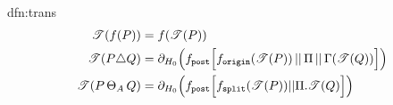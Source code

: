 \documentclass[../hons_project.tex]{subfiles}
\begin{document}
\begin{dfn}{dfn:trans}{}
\begin{align*}
		\mathscr{T}(f(P))           & = f(\mathscr{T}(P))                                                                                                                                                                               \\
		\mathscr{T}(P \triangle Q) & = \partial_{H_{0}}\Bigl(f_{\mathtt{post}}\Bigl[ f_{\mathtt{origin}}(\mathscr{T}(P)) \,\vert\vert\, \Pi \,\vert\vert\, \Gamma(\mathscr{T}(Q)) \Bigr]\Bigr)                                                                          \\
		\mathscr{T}(P \,\Theta_{A}\, Q)     & = \partial_{H_{0}}\Bigl(f_{\mathtt{post}} \Bigl[ f_{\mathtt{split}}(\mathscr{T}(P)) | | \Pi.\mathscr{T}(Q) \Bigr]\Bigr)
	\end{align*}
\end{dfn}
\end{document}

